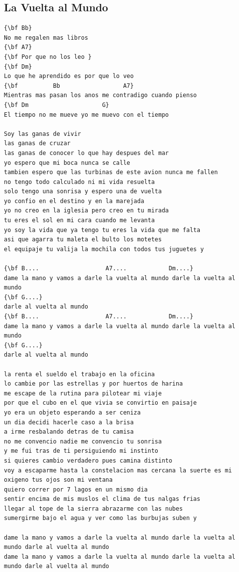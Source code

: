 \documentclass[a4paper]{article}
\begin{document}
\subsection{La Vuelta al Mundo} %
\label{sub:La Vuelta al Mu}

\begin{Verbatim}[commandchars=\\\{\}]
{\bf Bb}
No me regalen mas libros
{\bf A7}
{\bf Por que no los leo }
{\bf Dm}
Lo que he aprendido es por que lo veo 
{\bf          Bb                  A7}
Mientras mas pasan los anos me contradigo cuando pienso 
{\bf Dm                     G}
El tiempo no me mueve yo me muevo con el tiempo 

Soy las ganas de vivir 
las ganas de cruzar 
las ganas de conocer lo que hay despues del mar 
yo espero que mi boca nunca se calle 
tambien espero que las turbinas de este avion nunca me fallen 
no tengo todo calculado ni mi vida resuelta 
solo tengo una sonrisa y espero una de vuelta
yo confio en el destino y en la marejada 
yo no creo en la iglesia pero creo en tu mirada 
tu eres el sol en mi cara cuando me levanta 
yo soy la vida que ya tengo tu eres la vida que me falta 
asi que agarra tu maleta el bulto los motetes 
el equipaje tu valija la mochila con todos tus juguetes y 

{\bf B....                   A7....            Dm....}
dame la mano y vamos a darle la vuelta al mundo darle la vuelta al mundo 
{\bf G....}
darle al vuelta al mundo 
{\bf B....                   A7....            Dm....}
dame la mano y vamos a darle la vuelta al mundo darle la vuelta al mundo 
{\bf G....}
darle al vuelta al mundo 

la renta el sueldo el trabajo en la oficina 
lo cambie por las estrellas y por huertos de harina 
me escape de la rutina para pilotear mi viaje 
por que el cubo en el que vivia se convirtio en paisaje 
yo era un objeto esperando a ser ceniza 
un dia decidi hacerle caso a la brisa 
a irme resbalando detras de tu camisa 
no me convencio nadie me convencio tu sonrisa 
y me fui tras de ti persiguiendo mi instinto 
si quieres cambio verdadero pues camina distinto 
voy a escaparme hasta la constelacion mas cercana la suerte es mi oxigeno tus ojos son mi ventana 
quiero correr por 7 lagos en un mismo dia 
sentir encima de mis muslos el clima de tus nalgas frias 
llegar al tope de la sierra abrazarme con las nubes 
sumergirme bajo el agua y ver como las burbujas suben y

dame la mano y vamos a darle la vuelta al mundo darle la vuelta al mundo darle al vuelta al mundo 
dame la mano y vamos a darle la vuelta al mundo darle la vuelta al mundo darle al vuelta al mundo
\end{Verbatim}
\newpage
\end{document}
